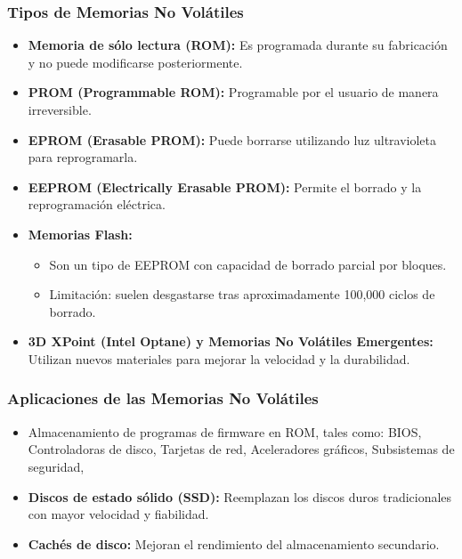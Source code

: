 \subsubsection*{Tipos de Memorias No Volátiles}
\begin{itemize}
    \item \textbf{Memoria de sólo lectura (ROM):}
        Es programada durante su fabricación y no puede modificarse posteriormente.
    \item \textbf{PROM (Programmable ROM):}
        Programable por el usuario de manera irreversible.
    \item \textbf{EPROM (Erasable PROM):}
        Puede borrarse utilizando luz ultravioleta para reprogramarla.
    \item \textbf{EEPROM (Electrically Erasable PROM):}
        Permite el borrado y la reprogramación eléctrica.
    \item \textbf{Memorias Flash:}
    \begin{itemize}
        \item Son un tipo de EEPROM con capacidad de borrado parcial por bloques.
        \item Limitación: suelen desgastarse tras aproximadamente 100,000 ciclos de borrado.
    \end{itemize}
    \item \textbf{3D XPoint (Intel Optane) y Memorias No Volátiles Emergentes:}
        Utilizan nuevos materiales para mejorar la velocidad y la durabilidad.
\end{itemize}

\subsubsection*{Aplicaciones de las Memorias No Volátiles}
\begin{itemize}
    \item Almacenamiento de programas de firmware en ROM, tales como:
        BIOS, 
        Controladoras de disco, 
        Tarjetas de red, 
        Aceleradores gráficos, 
        Subsistemas de seguridad, 
    \item \textbf{Discos de estado sólido (SSD):}
        Reemplazan los discos duros tradicionales con mayor velocidad y fiabilidad.
    \item \textbf{Cachés de disco:}
        Mejoran el rendimiento del almacenamiento secundario.
\end{itemize}
